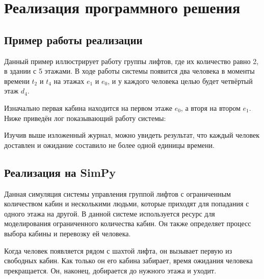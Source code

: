 		

	\section{Реализация программного решения}

		\subsection{Пример работы реализации}

	Данный пример иллюстрирует работу группы лифтов, где их количество равно 2, в здании с 5 этажами.
		В ходе работы системы появится два человека в моменты времени $t_2$ и $t_4$ на этажах $e_1$ и $e_0$,
		и у каждого человека целью будет четвёртый этаж $d_4$.

	Изначально первая кабина находится на первом этаже $e_0$, а вторя на втором $e_1$.
		Ниже приведён лог показывающий работу системы:

	Изучив выше изложенный журнал, можно увидеть результат, что каждый человек доставлен и ожидание составило не более одной единицы времени.


		\subsection{Реализация на SimPy}

			Данная симуляция системы управления группой лифтов с ограниченным количеством кабин и несколькими людьми,
				которые приходят для попадания с одного этажа на другой.
				В данной системе используется ресурс для моделирования ограниченного количества кабин.
				Он также определяет процесс выбора кабины и перевозку ей человека.

			Когда человек появляется рядом с шахтой лифта, он вызывает первую из свободных кабин.
				Как только он его кабина забирает, время ожидания человека прекращается.
				Он, наконец, добирается до нужного этажа и уходит.

